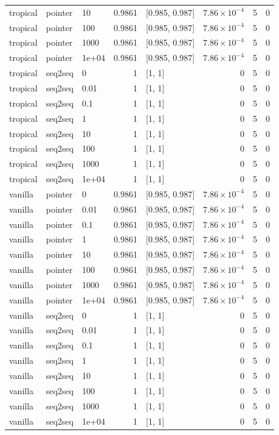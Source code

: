 \documentclass[10pt]{article}
\begin{document}
{\begin{longtable}{lllrlrrr}
tropical & pointer & 10 & 0.9861 & [0.985, 0.987] & $7.86\times10^{-4}$ & 5 & 0\\
tropical & pointer & 100 & 0.9861 & [0.985, 0.987] & $7.86\times10^{-4}$ & 5 & 0\\
tropical & pointer & 1000 & 0.9861 & [0.985, 0.987] & $7.86\times10^{-4}$ & 5 & 0\\
tropical & pointer & 1e+04 & 0.9861 & [0.985, 0.987] & $7.86\times10^{-4}$ & 5 & 0\\
tropical & seq2seq & 0 & 1 & [1, 1] & 0 & 5 & 0\\
tropical & seq2seq & 0.01 & 1 & [1, 1] & 0 & 5 & 0\\
tropical & seq2seq & 0.1 & 1 & [1, 1] & 0 & 5 & 0\\
tropical & seq2seq & 1 & 1 & [1, 1] & 0 & 5 & 0\\
tropical & seq2seq & 10 & 1 & [1, 1] & 0 & 5 & 0\\
tropical & seq2seq & 100 & 1 & [1, 1] & 0 & 5 & 0\\
tropical & seq2seq & 1000 & 1 & [1, 1] & 0 & 5 & 0\\
tropical & seq2seq & 1e+04 & 1 & [1, 1] & 0 & 5 & 0\\
vanilla & pointer & 0 & 0.9861 & [0.985, 0.987] & $7.86\times10^{-4}$ & 5 & 0\\
vanilla & pointer & 0.01 & 0.9861 & [0.985, 0.987] & $7.86\times10^{-4}$ & 5 & 0\\
vanilla & pointer & 0.1 & 0.9861 & [0.985, 0.987] & $7.86\times10^{-4}$ & 5 & 0\\
vanilla & pointer & 1 & 0.9861 & [0.985, 0.987] & $7.86\times10^{-4}$ & 5 & 0\\
vanilla & pointer & 10 & 0.9861 & [0.985, 0.987] & $7.86\times10^{-4}$ & 5 & 0\\
vanilla & pointer & 100 & 0.9861 & [0.985, 0.987] & $7.86\times10^{-4}$ & 5 & 0\\
vanilla & pointer & 1000 & 0.9861 & [0.985, 0.987] & $7.86\times10^{-4}$ & 5 & 0\\
vanilla & pointer & 1e+04 & 0.9861 & [0.985, 0.987] & $7.86\times10^{-4}$ & 5 & 0\\
vanilla & seq2seq & 0 & 1 & [1, 1] & 0 & 5 & 0\\
vanilla & seq2seq & 0.01 & 1 & [1, 1] & 0 & 5 & 0\\
vanilla & seq2seq & 0.1 & 1 & [1, 1] & 0 & 5 & 0\\
vanilla & seq2seq & 1 & 1 & [1, 1] & 0 & 5 & 0\\
vanilla & seq2seq & 10 & 1 & [1, 1] & 0 & 5 & 0\\
vanilla & seq2seq & 100 & 1 & [1, 1] & 0 & 5 & 0\\
vanilla & seq2seq & 1000 & 1 & [1, 1] & 0 & 5 & 0\\
vanilla & seq2seq & 1e+04 & 1 & [1, 1] & 0 & 5 & 0\\
\bottomrule
\end{longtable}
}
\end{document}
